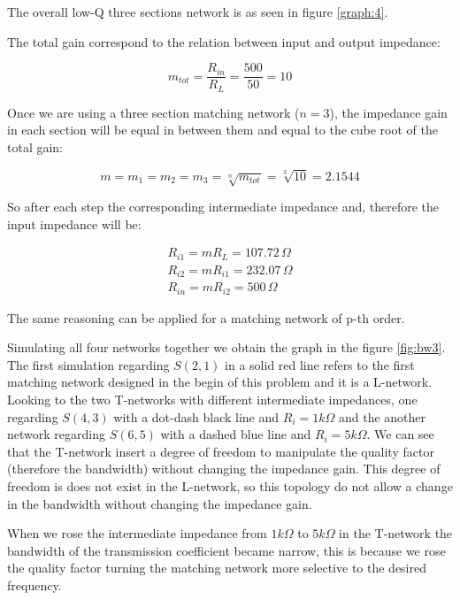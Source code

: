 The overall low-Q three sections network is as seen in figure \ref{graph:4}. 



The total gain correspond to the relation between input and output impedance:

\begin{equation} \label{lQ:1}
    m_{tot} = \frac{R_{in}}{R_L} = \frac{500}{50} = 10
\end{equation}

Once we are using a three section matching network ($n=3$), the impedance gain in each section will be equal in between them and equal to the cube root of the total gain:

\begin{equation} \label{lQ:2}
    m = m_1 = m_2 = m_3 = \sqrt[n]{m_{tot}} = \sqrt[3]{10} = 2.1544
\end{equation}

So after each step the corresponding intermediate impedance and, therefore the input impedance will be:

\begin{equation} \label{lQ:3}
    \begin{aligned}
        R_{i1} = m R_L = 107.72 \, \Omega \\
        R_{i2} = m R_{i1} = 232.07 \, \Omega \\
        R_{in} = m R_{i2} = 500 \, \Omega 
    \end{aligned}
\end{equation}

The same reasoning can be applied for a matching network of p-th order.

Simulating all four networks together we obtain the graph in the figure \ref{fig:bw3}. The first simulation regarding $S(2,1)$ in a solid red line refers to the first matching network designed in the begin of this problem and it is a L-network. Looking to the two T-networks with different intermediate impedances, one regarding $S(4,3)$ with a dot-dash black line and $R_i = 1 k\Omega$ and the another network regarding $S(6,5)$ with a dashed blue line and $R_i = 5 k\Omega$. We can see that the T-network insert a degree of freedom to manipulate the quality factor (therefore the bandwidth) without changing the impedance gain. This degree of freedom is does not exist in the L-network, so this topology do not allow a change in the bandwidth without changing the impedance gain.

When we rose the intermediate impedance from $1k\Omega$ to $5k\Omega$ in the T-network the bandwidth of the transmission coefficient became narrow, this is because we rose the quality factor turning the matching network more selective to the desired frequency.

